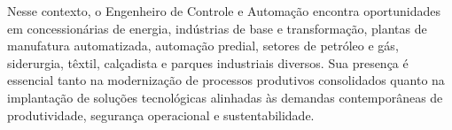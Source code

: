Nesse contexto, o Engenheiro de Controle e Automação encontra oportunidades em concessionárias de energia, indústrias de base e transformação, plantas de manufatura automatizada, automação predial, setores de petróleo e gás, siderurgia, têxtil, calçadista e parques industriais diversos. Sua presença é essencial tanto na modernização de processos produtivos consolidados quanto na implantação de soluções tecnológicas alinhadas às demandas contemporâneas de produtividade, segurança operacional e sustentabilidade.

